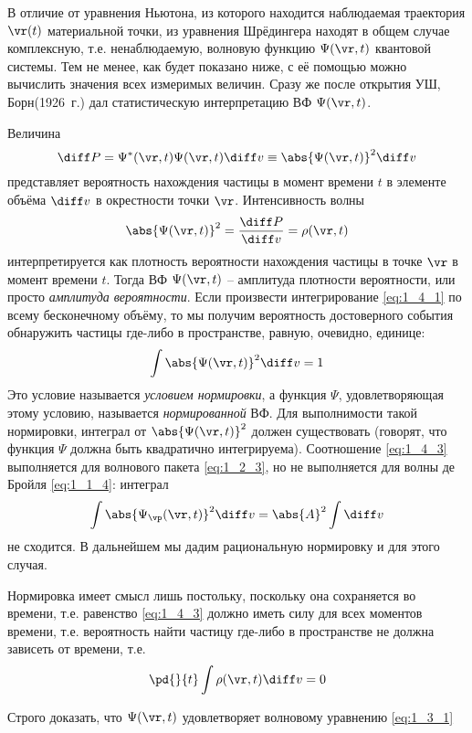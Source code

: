 В отличие от уравнения Ньютона\footnotemark, из которого находится наблюдаемая траектория $\vr(t)$ материальной точки, из уравнения Шрёдингера находят в общем случае комплексную, т.е. ненаблюдаемую, волновую функцию $\Psi(\vr, t)$ квантовой системы. Тем не менее, как будет показано ниже, с её помощью можно вычислить значения всех измеримых величин. Сразу же после открытия УШ, Борн\footnotemark (1926~г.) дал статистическую интерпретацию ВФ $\Psi(\vr, t)$.

Величина
\begin{equation}
\label{eq:1_4_1}
\diff P = \Psi^*(\vr,t) \Psi(\vr,t) \diff v \equiv \abs{\Psi(\vr,t)}^2\diff v
\end{equation}%
%
представляет вероятность нахождения частицы в момент времени $t$ в элементе объёма $\diff v$ в окрестности точки $\vr$. Интенсивность волны
\begin{equation}
\label{eq:1_4_2}
\abs{\Psi(\vr,t)}^2 = \frac{\diff P}{\diff v} = \rho(\vr,t)
\end{equation}%
%
интерпретируется как плотность вероятности нахождения частицы в точке $\vr$ в момент времени $t$. Тогда ВФ $\Psi(\vr, t)$ -- амплитуда плотности вероятности, или просто {\em амплитуда вероятности}. Если произвести интегрирование \eqref{eq:1_4_1} по всему бесконечному объёму, то мы получим вероятность достоверного события обнаружить частицы где-либо в пространстве, равную, очевидно, единице:
\begin{equation}
\label{eq:1_4_3}
\int \abs{\Psi(\vr,t)}^2 \diff v = 1
\end{equation}
Это условие называется {\em условием нормировки}, а функция $\Psi$, удовлетворяющая этому условию, называется {\em нормированной} ВФ. Для выполнимости такой нормировки, интеграл от $\abs{\Psi(\vr,t)}^2$ должен существовать (говорят, что функция $\Psi$ должна быть квадратично интегрируема). Соотношение \eqref{eq:1_4_3} выполняется для волнового пакета \eqref{eq:1_2_3}, но не выполняется для волны де Бройля \eqref{eq:1_1_4}: интеграл
$$
\int \abs{\Psi_{\vp}(\vr,t)}^2 \diff v = \abs{A}^2 \int \diff v
$$
не сходится. В дальнейшем мы дадим рациональную нормировку и для этого случая.

Нормировка имеет смысл лишь постольку, поскольку она сохраняется во времени, т.е. равенство \eqref{eq:1_4_3} должно иметь силу для всех моментов времени, т.е. вероятность найти частицу где-либо в пространстве не должна зависеть от времени, т.е.
$$
\pd{}{t} \int \rho(\vr,t) \diff v = 0
$$
\begin{excr}
Строго доказать, что $\Psi(\vr,t)$ удовлетворяет волновому уравнению \eqref{eq:1_3_1}
\end{excr}


